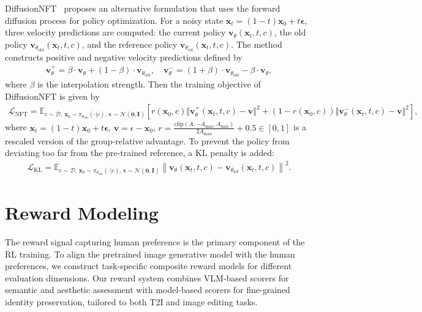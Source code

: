 \documentclass{llmxive}
\providecommand{\bm}[1]{\boldsymbol{#1}}
\providecommand{\mathbf}[1]{\bm{#1}}
\begin{document}
DiffusionNFT~\citep{zheng2025diffusionnft} proposes an alternative formulation that uses the forward diffusion process for policy optimization. For a noisy state $\mathbf{x}_t=(1-t)\mathbf{x}_0+t\mathbf{\epsilon}$, three velocity predictions are computed: the current policy $\mathbf{v}_\theta(\mathbf{x}_t, t,c)$, the old policy $\mathbf{v}_{\theta_{\text{old}}}(\mathbf{x}_t, t,c)$, and the reference policy $\mathbf{v}_{\theta_{\text{ref}}}(\mathbf{x}_t, t,c)$. The method constructs positive and negative velocity predictions defined by
\begin{align}
    \mathbf{v}^{+}_\theta = \beta \cdot \mathbf{v}_\theta + (1-\beta) \cdot \mathbf{v}_{\theta_{\text{old}}}, \quad
    \mathbf{v}^{-}_\theta = (1+\beta) \cdot \mathbf{v}_{\theta_{\text{old}}} - \beta \cdot \mathbf{v}_\theta,
\end{align}
where $\beta$ is the interpolation strength. Then the training objective of DiffusionNFT is given by
\begin{align}
    \mathcal{L}_{\text{NFT}} = \mathbb{E}_{c\sim\mathcal{D},\,\mathbf{x}_0 \sim \pi_{\theta_{\text{old}}}(\cdot | c),\, \mathbf{\epsilon}\sim\mathcal{N}(\mathbf{0},\mathbf{I})}\left[r(\mathbf{x}_0, c) \Vert \mathbf{v}^{+}_\theta(\mathbf{x}_t, t,c)-\mathbf{v}\Vert^2+(1-r(\mathbf{x}_0, c)) \Vert \mathbf{v}^{-}_\theta(\mathbf{x}_t, t,c)-\mathbf{v}\Vert^2\right],
    \label{eq:nft-loss}
\end{align}
where $\mathbf{x}_t=(1-t)\mathbf{x}_0+t\mathbf{\epsilon}$, $\mathbf{v}=\epsilon-\mathbf{x}_0$, $r=\frac{\text{clip}(A, -A_{\max}, A_{\max})}{2 A_{\max}} + 0.5\in[0,1]$ is a rescaled version of the group-relative advantage. 
To prevent the policy from deviating too far from the pre-trained reference, a KL penalty is added:
\begin{align}
    \mathcal{L}_{\text{KL}} = \mathbb{E}_{c\sim\mathcal{D},\,\mathbf{x}_0 \sim \pi_{\theta_{\text{old}}}(\cdot | c),\, \mathbf{\epsilon}\sim\mathcal{N}(\mathbf{0},\mathbf{I})}\left\| \mathbf{v}_\theta(\mathbf{x}_t, t,c) - \mathbf{v}_{\theta_{\text{ref}}}(\mathbf{x}_t, t,c) \right\|^2.
\end{align}

\section{Reward Modeling}
\label{sec:reward}
The reward signal capturing human preference is the primary component of the RL training. To align the pretrained image generative model with the human preferences, we construct task-specific composite reward models for different evaluation dimensions. Our reward system combines VLM-based scorers for semantic and aesthetic assessment with model-based scorers for fine-grained identity preservation, tailored to both T2I and image editing tasks.
\end{document}
